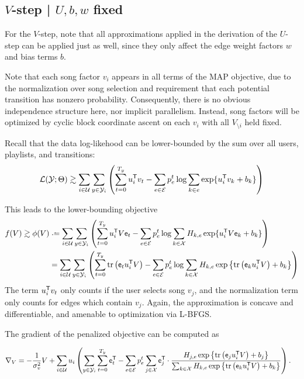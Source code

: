 \documentclass{article}
\def\e{\ensuremath{\mathsf{e}}}
\def\E{\ensuremath{\mathcal{E}}}
\def\U{\ensuremath{\mathcal{U}}}
\begin{document}
\subsection{$V$-step | $U, b, w$ fixed}
For the $V$-step, note that all approximations applied in the derivation of the $U$-step can be applied just as well, since they only affect the edge weight factors $w$ and bias terms
$b$.

Note that each song factor $v_i$ appears in all terms of the MAP objective, due to the normalization over song selection and requirement that each potential transition has nonzero 
probability.  Consequently, there is no obvious independence structure here, nor implicit parallelism.  
Instead, song factors will be optimized by cyclic block coordinate ascent on each $v_i$ with all $V_{\setminus i}$ held fixed.

Recall that the data log-likehood can be lower-bounded by the sum over all users, playlists, and transitions:
\[
\Ell(\Y; \Theta) \gtrsim \sum_{i \in \U} \sum_{y \in \Y_i} \left(\sum_{t=0}^{T_y} u_i\trans v_t - \sum_{e \in \E} p_e^t \log \sum_{k\in e} \exp\{u_i\trans v_k + b_k\} \right)
\]

This leads to the lower-bounding objective 
\begin{align*}
f(V) \gtrsim \phi(V) &\defeq \sum_{i \in \U} \sum_{y \in \Y_i} \left(\sum_{t=0}^{T_y} u_i\trans V \e_t - \sum_{e \in \E} p_e^t \log \sum_{k\in \X} H_{k,e} \exp\{u_i\trans V \e_k + b_k\}
\right)\\
&= \sum_{i \in \U} \sum_{y \in \Y_i} \left(\sum_{t=0}^{T_y} \trace\left(\e_t u_i\trans V\right)- \sum_{e \in \E} p_e^t \log \sum_{k\in \X} H_{k,e} \exp\left\{\trace\left(\e_k u_i\trans
V\right) + b_k\right\} \right)
\end{align*}
The term $u_i^\mathsf{T} v_t$ only counts if the user selects song $v_j$, and the normalization term only counts for edges which contain $v_j$.  Again, the approximation is concave and
differentiable, and amenable to optimization via L-BFGS.

The gradient of the penalized objective can be computed as 

\begin{align}
\nabla_{V} &= -\frac{1}{\sigma_v^2} V + \sum_{i \in \U} u_i \left(\sum_{y \in \Y_i}
\sum_{t=0}^{T_y} \e_t\trans
- \sum_{e \in \E} p_e^t \sum_{j \in \X} \e_j\trans \cdot \frac{H_{j,e} \exp\left\{\trace\left( \e_j u_i\trans V\right) + b_j\right\}}{\sum_{k\in\X} H_{k,e}
  \exp\left\{\trace\left(\e_k u_i\trans V\right) + b_k\right\}}
\right).
\end{align}
\end{document}
